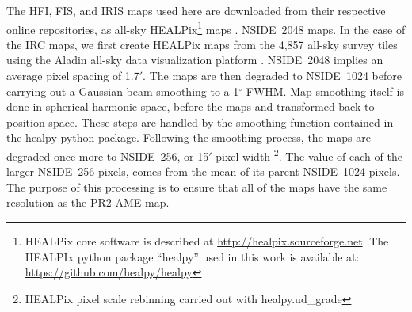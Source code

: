         The HFI, FIS, and IRIS maps used here are downloaded from their respective online repositories, as all-sky HEALPix\footnote{HEALPix core software is described at \url{http://healpix.sourceforge.net}. The HEALPIx python package ``healpy'' used in this work is available at: \url{https://github.com/healpy/healpy}} maps \citep{gorski05}.   NSIDE~2048 maps. In the case of the IRC maps, we first create HEALPix maps from the 4,857 all-sky survey tiles using the Aladin all-sky data visualization platform \citep{bonnarel00}. NSIDE~2048 implies an average pixel spacing of 1.7$'$. The maps are then degraded to NSIDE~1024 before carrying out a Gaussian-beam smoothing to a 1$^{\circ}$ FWHM. Map smoothing itself is done in spherical harmonic space, before the maps and transformed back to position space. These steps are handled by the smoothing function contained in the healpy python package. Following the smoothing process, the maps are degraded once more to NSIDE~256, or 15$'$ pixel-width \footnote{HEALPix pixel scale rebinning carried out with healpy.ud\_grade}. The value of each of the larger NSIDE~256 pixels, comes from the mean of its parent NSIDE~1024 pixels. The purpose of this processing is to ensure that all of the maps have the same resolution as the PR2 AME map.
